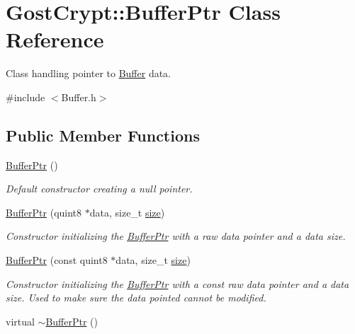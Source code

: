 \hypertarget{class_gost_crypt_1_1_buffer_ptr}{}\section{Gost\+Crypt\+:\+:Buffer\+Ptr Class Reference}
\label{class_gost_crypt_1_1_buffer_ptr}


Class handling pointer to \hyperlink{class_gost_crypt_1_1_buffer}{Buffer} data.  




{\ttfamily \#include $<$Buffer.\+h$>$}

\subsection*{Public Member Functions}
\begin{DoxyCompactItemize}
\item 
\hyperlink{class_gost_crypt_1_1_buffer_ptr_a40b0afec9bd544f8b70e34dfb7409307}{Buffer\+Ptr} ()
\begin{DoxyCompactList}\small\item\em Default constructor creating a null pointer. \end{DoxyCompactList}\item 
\hyperlink{class_gost_crypt_1_1_buffer_ptr_a519a1bcf230de077c8bbc1adb3b586b4}{Buffer\+Ptr} (quint8 $\ast$data, size\+\_\+t \hyperlink{class_gost_crypt_1_1_buffer_ptr_a1fd092a6706a9ad67a601280ea1377d5}{size})
\begin{DoxyCompactList}\small\item\em Constructor initializing the \hyperlink{class_gost_crypt_1_1_buffer_ptr}{Buffer\+Ptr} with a raw data pointer and a data size. \end{DoxyCompactList}\item 
\hyperlink{class_gost_crypt_1_1_buffer_ptr_ae68f62b21df95bcca8ef7adbaf6efb16}{Buffer\+Ptr} (const quint8 $\ast$data, size\+\_\+t \hyperlink{class_gost_crypt_1_1_buffer_ptr_a1fd092a6706a9ad67a601280ea1377d5}{size})
\begin{DoxyCompactList}\small\item\em Constructor initializing the \hyperlink{class_gost_crypt_1_1_buffer_ptr}{Buffer\+Ptr} with a const raw data pointer and a data size. Used to make sure the data pointed cannot be modified. \end{DoxyCompactList}\item 
virtual \hyperlink{class_gost_crypt_1_1_buffer_ptr_a4558ae2ea321f4aa9ad5debd0aa85310}{$\sim$\+Buffer\+Ptr} ()

\end{DoxyCompactItemize}
